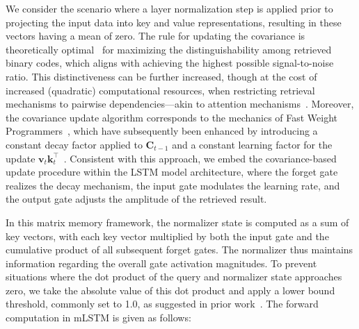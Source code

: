 We consider the scenario where a layer normalization step is applied prior to projecting the input data into key and value representations, resulting in these vectors having a mean of zero. The rule for updating the covariance is theoretically optimal~\citep{Dayan:91} for maximizing the distinguishability among retrieved binary codes, which aligns with achieving the highest possible signal-to-noise ratio. This distinctiveness can be further increased, though at the cost of increased (quadratic) computational resources, when restricting retrieval mechanisms to pairwise dependencies—akin to attention mechanisms~\citep{Krotov:16,Krotov:17,Ramsauer:21}. Moreover, the covariance update algorithm corresponds to the mechanics of Fast Weight Programmers~\citep{Schmidhuber:92ncfastweights,Schlag:21}, which have subsequently been enhanced by introducing a constant decay factor applied to $\mathbf{C}_{t-1}$ and a constant learning factor for the update $\mathbf{v}_{t} \mathbf{k}_t ^\top$~\citep{Ba:16}. Consistent with this approach, we embed the covariance-based update procedure within the LSTM model architecture, where the forget gate realizes the decay mechanism, the input gate modulates the learning rate, and the output gate adjusts the amplitude of the retrieved result.

In this matrix memory framework, the normalizer state is computed as a sum of key vectors, with each key vector multiplied by both the input gate and the cumulative product of all subsequent forget gates. The normalizer thus maintains information regarding the overall gate activation magnitudes. To prevent situations where the dot product of the query and normalizer state approaches zero, we take the absolute value of this dot product and apply a lower bound threshold, commonly set to 1.0, as suggested in prior work~\citep{Sun:23arxiv}. The forward computation in mLSTM is given as follows:

